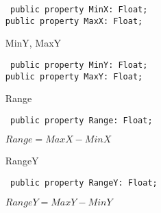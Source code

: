 \documentclass[12pt,a4paper,oneside]{report}
\newcommand{\declarationitem}[1]{{\addfontfeatures{FakeBold=1.3} #1}}
\newcommand{\code}[1]{\texttt{#1}}
\begin{document}
\begin{itemize}
\begin{flushleft}
	\code{
		public property MinX: Float;\\
		public property MaxX: Float;}
	\end{flushleft}
	\par  \label{lmPointsVec.TPoints-MaxX}
	\item[\declarationitem{MinY, MaxY}\hfill]
	\begin{flushleft}
		\code{
			public property MinY: Float;\\
			public property MaxY: Float;}
	\end{flushleft}
	\label{lmPointsVec.TPoints-MinY}
	\label{lmPointsVec.TPoints-Range}
	\item[\declarationitem{Range}\hfill]
	\begin{flushleft}
		\code{
			public property Range: Float;}
	\end{flushleft}
	$Range=MaxX-MinX$\label{lmPointsVec.TPoints-RangeY}

	\item[\declarationitem{RangeY}\hfill]
	\begin{flushleft}
		\code{
			public property RangeY: Float;}
	\end{flushleft}
	$RangeY=MaxY-MinY$
	\end{itemize}
	
\end{document}
